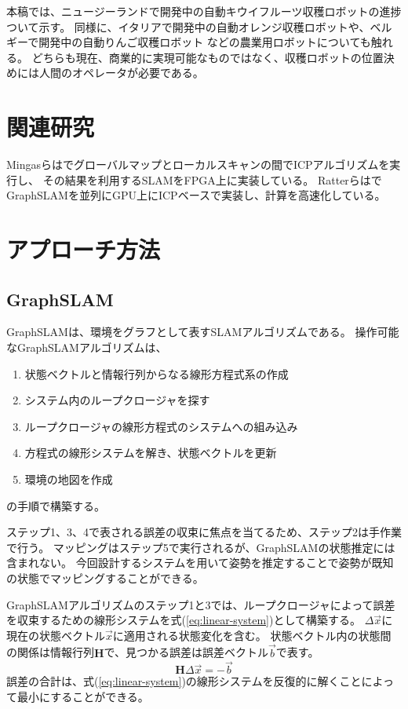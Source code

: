 \documentclass{jsarticle}
\begin{document}
本稿では、ニュージーランドで開発中の自動キウイフルーツ収穫ロボットの進捗ついて示す。
同様に、イタリアで開発中の自動オレンジ収穫ロボットや、ベルギーで開発中の自動りんご収穫ロボット
などの農業用ロボットについても触れる。
どちらも現在、商業的に実現可能なものではなく、収穫ロボットの位置決めには人間のオペレータが必要である。

\section{関連研究}
Mingasらは\cite{Mingas2012}でグローバルマップとローカルスキャンの間でICPアルゴリズムを実行し、
その結果を利用するSLAMをFPGA上に実装している。
Ratterらは\cite{Ratter2013}でGraphSLAMを並列にGPU上にICPベースで実装し、計算を高速化している。

\section{アプローチ方法}\label{sec:approach}
\subsection{GraphSLAM}
GraphSLAMは、環境をグラフとして表すSLAMアルゴリズムである。
操作可能なGraphSLAMアルゴリズムは、
\begin{enumerate}
    \item 状態ベクトルと情報行列からなる線形方程式系の作成
    \item システム内のループクロージャを探す
    \item ループクロージャの線形方程式のシステムへの組み込み
    \item 方程式の線形システムを解き、状態ベクトルを更新
    \item 環境の地図を作成
\end{enumerate}
の手順で構築する。

ステップ1、3、4で表される誤差の収束に焦点を当てるため、ステップ2は手作業で行う。
マッピングはステップ5で実行されるが、GraphSLAMの状態推定には含まれない。
今回設計するシステムを用いて姿勢を推定することで姿勢が既知の状態でマッピングすることができる。

GraphSLAMアルゴリズムのステップ1と3では、ループクロージャによって誤差を収束するための線形システムを式(\ref{eq:linear-system})として構築する。
$\Delta\vec{x}$に現在の状態ベクトル$\vec{x}$に適用される状態変化を含む。
状態ベクトル内の状態間の関係は情報行列$\mathbf{H}$で、見つかる誤差は誤差ベクトル$\vec{b}$で表す。
\begin{equation}
    \mathbf{H}\Delta\vec{x}=-\vec{b} \label{eq:linear-system}
\end{equation}
誤差の合計は、式(\ref{eq:linear-system})の線形システムを反復的に解くことによって最小にすることができる。
\end{document}
